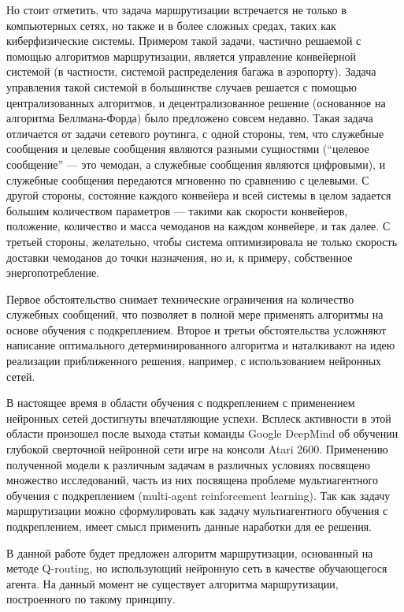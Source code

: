 \documentclass[]{itmo-student-thesis}
\begin{document}
Но стоит отметить, что задача маршрутизации встречается не только в компьютерных сетях, но
также и в более сложных средах, таких как киберфизические системы. Примером такой
задачи, частично решаемой с помощью алгоритмов маршрутизации, является
управление конвейерной системой (в частности, системой распределения багажа в
аэропорту). Задача управления такой системой в большинстве случаев решается с
помощью централизованных алгоритмов, и децентрализованное решение (основанное на
алгоритма Беллмана-Форда) было предложено совсем недавно\cite{vyatkin-controllers}. 
Такая задача отличается от задачи сетевого роутинга, с одной
стороны, тем, что служебные сообщения и целевые сообщения являются разными
сущностями (``целевое сообщение'' --- это чемодан, а служебные сообщения являются
цифровыми), и служебные сообщения передаются мгновенно по сравнению с целевыми.
С другой стороны, состояние каждого конвейера и всей системы в целом задается
большим количеством параметров --- такими как скорости конвейеров, положение,
количество и масса чемоданов на каждом конвейере, и так далее. С третьей
стороны, желательно, чтобы система оптимизировала не только скорость доставки
чемоданов до точки назначения, но и, к примеру, собственное энергопотребление.

Первое обстоятельство снимает технические ограничения на количество служебных
сообщений, что позволяет в полной мере применять алгоритмы на основе обучения с
подкреплением. Второе и третьи обстоятельства усложняют написание оптимального
детерминированного алгоритма и наталкивают на идею реализации приближенного
решения, например, с использованием нейронных сетей.

В настоящее время в области обучения с подкреплением с применением нейронных
сетей достигнуты впечатляющие успехи. Всплеск активности в этой области
произошел после выхода статьи команды Google DeepMind об обучении глубокой
сверточной нейронной сети игре на консоли Atari 2600\cite{deepmind-dqn-orig}.
Применению полученной модели к различным задачам в различных условиях посвящено
множество исследований, часть из них посвящена проблеме мультиагентного обучения
с подкреплением (multi-agent reinforcement learning). Так как задачу
маршрутизации можно сформулировать как задачу мультиагентного обучения с
подкреплением, имеет смысл применить данные наработки для ее решения.

В данной работе будет предложен алгоритм маршрутизации, основанный на методе
Q-routing, но использующий нейронную сеть в качестве обучающегося агента.
На данный момент не существует алгоритма маршрутизации, построенного по такому
принципу.
\end{document}
